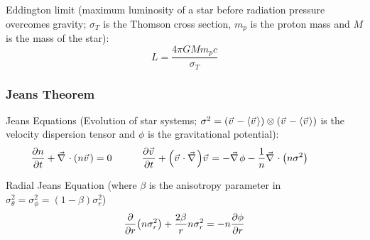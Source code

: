 			Eddington limit (maximum luminosity of a star before radiation pressure overcomes gravity; $\sigma_T$ is the Thomson cross section, $m_p$ is the proton mass and $M$ is the mass of the star):
			\begin{equation}
				L = \frac{4 \pi G M m_p c}{\sigma_T}
			\end{equation}


		\subsubsection{Jeans Theorem}
			Jeans Equations (Evolution of star systems; $\sigma^2 = \qty(\vec{v}-\avg{\vec{v}})\otimes\qty(\vec{v}-\avg{\vec{v}})$ is the velocity dispersion tensor and $\phi$ is the gravitational potential):
			\begin{equation}
				\pdv{n}{t} + \Nabla\cdot\qty(n\vec{v}) = 0 \hsp
				\pdv{\vec{v}}{t} + \qty(\vec{v}\cdot\Nabla)\vec{v} = -\Nabla\phi -\frac{1}{n}\Nabla\cdot\qty(n\sigma^2) \hsp
			\end{equation}

			\noindent
			Radial Jeans Equation (where $\beta$ is the anisotropy parameter in $\sigma_\theta^2 = \sigma_\phi^2 = (1-\beta) \sigma_r^2$)
			\begin{equation}
				\pdv{r} \qty(n\sigma_r^2) + \frac{2\beta}{r} n\sigma_r^2 = -n\pdv{\phi}{r}
			\end{equation}
